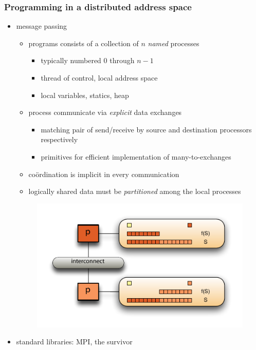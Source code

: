 \begin{frame}[fragile]
%
  \frametitle{Programming in a distributed address space}
%
  \begin{itemize}
%
  \item message passing
    \begin{itemize}
      \item programs consists of a collection of $n$ {\em named} processes
        \begin{itemize}
        \item typically numbered 0 through $n-1$
        \item thread of control, local address space
        \item local variables, statics, heap
        \end{itemize}
      \item process communicate via {\em explicit} data exchanges
        \begin{itemize}
        \item matching pair of send/receive by source and destination processors respectively
        \item primitives for efficient implementation of many-to-exchanges
        \end{itemize}
      \item co\"ordination is implicit in every communication
      \item logically shared data must be {\em partitioned} among the local processes
    \end{itemize}
%
  \begin{figure}
    \centering
    \includegraphics[width=.70\linewidth]{figures/reduction-distributed.pdf}
    \label{fig:reduction-distributed}
  \end{figure}
%
  \item standard libraries: MPI, the survivor
  \end{itemize}
%
\end{frame}

